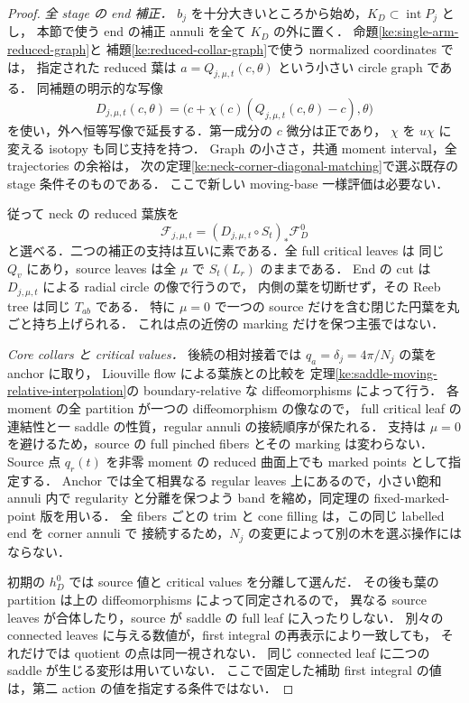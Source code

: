 \begin{proof}
\emph{全 stage の end 補正．}
$b_j$ を十分大きいところから始め，$K_D\subset\operatorname{int}P_j$ とし，
本節で使う end の補正 annuli を全て $K_D$ の外に置く．
命題\ref{ke:single-arm-reduced-graph}と
補題\ref{ke:reduced-collar-graph}で使う normalized coordinates では，
指定された reduced 葉は $a=Q_{j,\mu,t}(c,\theta)$ という小さい circle graph である．
同補題の明示的な写像
\[
 D_{j,\mu,t}(c,\theta)
 =\bigl(c+\chi(c)(Q_{j,\mu,t}(c,\theta)-c),\theta\bigr)
\]
を使い，外へ恒等写像で延長する．第一成分の $c$ 微分は正であり，
$\chi$ を $u\chi$ に変える isotopy も同じ支持を持つ．
Graph の小ささ，共通 moment interval，全 trajectories の余裕は，
次の定理\ref{ke:neck-corner-diagonal-matching}で選ぶ既存の stage 条件そのものである．
ここで新しい moving-base 一様評価は必要ない．

従って neck の reduced 葉族を
\[
 \mathcal F_{j,\mu,t}
   =(D_{j,\mu,t}\circ S_t)_*\mathcal F_D^0
\]
と選べる．二つの補正の支持は互いに素である．全 full critical leaves は
同じ $Q_v$ にあり，source leaves は全 $\mu$ で $S_t(L_r)$ のままである．
End の cut は $D_{j,\mu,t}$ による radial circle の像で行うので，
内側の葉を切断せず，その Reeb tree は同じ $T_{ab}$ である．
特に $\mu=0$ で一つの source だけを含む閉じた円葉を丸ごと持ち上げられる．
これは点の近傍の marking だけを保つ主張ではない．

\emph{Core collars と critical values．}
後続の相対接着では $q_a=\delta_j=4\pi/N_j$ の葉を anchor に取り，
Liouville flow による葉族との比較を
定理\ref{ke:saddle-moving-relative-interpolation}の
boundary-relative な diffeomorphisms によって行う．
各 moment の全 partition が一つの diffeomorphism の像なので，
full critical leaf の連結性と一 saddle の性質，regular annuli の接続順序が保たれる．
支持は $\mu=0$ を避けるため，source の full pinched fibers とその marking は変わらない．
Source 点 $q_r(t)$ を非零 moment の reduced 曲面上でも marked points として指定する．
Anchor では全て相異なる regular leaves 上にあるので，小さい飽和 annuli 内で
regularity と分離を保つよう band を縮め，同定理の fixed-marked-point 版を用いる．
全 fibers ごとの trim と cone filling は，この同じ labelled end を corner annuli で
接続するため，$N_j$ の変更によって別の木を選ぶ操作にはならない．

初期の $h_D^0$ では source 値と critical values を分離して選んだ．
その後も葉の partition は上の diffeomorphisms によって同定されるので，
異なる source leaves が合体したり，source が saddle の full leaf に入ったりしない．
別々の connected leaves に与える数値が，first integral の再表示により一致しても，
それだけでは quotient の点は同一視されない．
同じ connected leaf に二つの saddle が生じる変形は用いていない．
ここで固定した補助 first integral の値は，第二 action の値を指定する条件ではない．


\end{proof}
